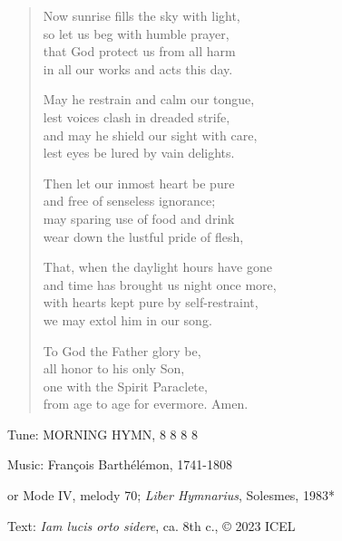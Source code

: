 \hymn

\begin{verse}
Now sunrise fills the sky with light,\\
so let us beg with humble prayer,\\
that God protect us from all harm\\
in all our works and acts this day.

May he restrain and calm our tongue,\\
lest voices clash in dreaded strife,\\
and may he shield our sight with care,\\
lest eyes be lured by vain delights.

Then let our inmost heart be pure\\
and free of senseless ignorance;\\
may sparing use of food and drink\\
wear down the lustful pride of flesh,

That, when the daylight hours have gone\\
and time has brought us night once more,\\
with hearts kept pure by self-restraint,\\
we may extol him in our song.

To God the Father glory be,\\
all honor to his only Son,\\
one with the Spirit Paraclete,\\
from age to age for evermore. Amen.
\end{verse}

\begin{hymnsource}
Tune: MORNING HYMN, 8 8 8 8

Music: François Barthélémon, 1741-1808

or Mode IV, melody 70; \emph{Liber Hymnarius}, Solesmes, 1983*

Text: \emph{Iam lucis orto sidere}, ca. 8th c., © 2023 ICEL
\end{hymnsource}